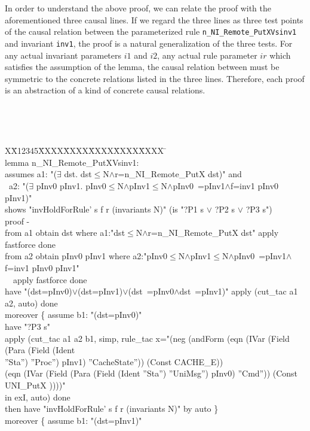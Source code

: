 \documentclass{llncs}
\newlength{\fminilength}
\newenvironment{fmini}[1][\linewidth]
  {\setlength{\fminilength}{#1\fboxsep-2\fboxrule}%
   \vspace{2ex}\noindent\begin{lrbox}{\fminibox}\begin{minipage}{\fminilength}%
   \mbox{ }\hfill\vspace{-2.5ex}}%
  {\end{minipage}\end{lrbox}\vspace{1ex}\hspace{0ex}%
   \framebox{\usebox{\fminibox}}}
\newenvironment{specification}
{\noindent\scriptsize
\tt\begin{fmini}\begin{tabbing}X\=X12345\=XXXX\=XXXX\=XXXX\=XXXX\=XXXX
\=\+\kill} {\end{tabbing}\normalfont\end{fmini}}
\def \twoSpaces {\ \ }
\def \twoSpaces {\ \ }
\begin{document}
In order to understand the above proof, we can relate the proof with the aforementioned three causal lines.  If we regard the three lines  as  three test points of the causal relation between the parameterized rule {\tt  n\_NI\_Remote\_PutXVsinv1} and invariant {\tt inv1}, the proof is a natural generalization of the three tests. For any actual invariant parameters $i1$ and $i2$, any actual rule parameter $ir$ which satisfies the assumption of the lemma, the causal relation between  must be symmetric to the concrete relations listed in the three lines. Therefore, each proof is an abstraction of a kind of concrete causal relations.

\begin{specification}\\
lemma n\_NI\_Remote\_PutXVsinv1:\\
assumes a1: "($\exists$ dst. dst$\le$N$\wedge$r=n\_NI\_Remote\_PutX  dst)" and\\\
a2: "($\exists$ pInv0 pInv1. pInv0$\le$N$\wedge$pInv1$\le$N$\wedge$pInv0~=pInv1$\wedge$f=inv1  pInv0 pInv1)"\\
shows "invHoldForRule' s f r (invariants N)" (is "?P1 s $\vee$ ?P2 s $\vee$ ?P3 s")\\
proof -\\
from a1 obtain dst where a1:"dst$\le$N$\wedge$r=n\_NI\_Remote\_PutX  dst" apply fastforce done\\
from a2 obtain pInv0 pInv1 where a2:"pInv0$\le$N$\wedge$pInv1$\le$N$\wedge$pInv0~=pInv1$\wedge$f=inv1  pInv0 pInv1" \\
\twoSpaces apply fastforce done\\
have "(dst=pInv0)$\vee$(dst=pInv1)$\vee$(dst~=pInv0$\wedge$dst~=pInv1)" apply (cut\_tac a1 a2, auto) done\\
moreover \{
  assume b1: "(dst=pInv0)"\\
  have "?P3 s"\\
  apply (cut\_tac a1 a2 b1, simp, rule\_tac x="(neg (andForm (eqn (IVar (Field (Para (Field (Ident \\
  ''Sta'') ''Proc'') pInv1) ''CacheState'')) (Const CACHE\_E))\\
  (eqn (IVar (Field (Para (Field (Ident ''Sta'') ''UniMsg'') pInv0) ''Cmd'')) (Const UNI\_PutX  ))))"\\ in exI, auto) done\\
  then have "invHoldForRule' s f r (invariants N)" by auto
\}\\
moreover \{
  assume b1: "(dst=pInv1)"\\

\end{specification}
\end{document}
